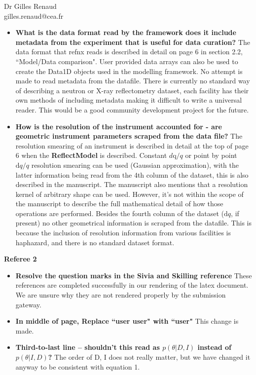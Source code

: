 \documentclass[fontsize=12pt, paper=a4]{scrlttr2}
\begin{document}
\begin{letter}{Dr Gilles Renaud \\ gilles.renaud@cea.fr}
\begin{itemize}
\item \textbf{What is the data format read by the framework does it include metadata from the experiment that is useful for data curation?} The data format that refnx reads is described in detail on page 6 in section 2.2, ``Model/Data comparison". User provided data arrays can also be used to create the Data1D objects used in the modelling framework. No attempt is made to read metadata from the datafile. There is currently no standard way of describing a neutron or X-ray reflectometry dataset, each facility has their own methods of including metadata making it difficult to write a universal reader. This would be a good community development project for the future.
\item \textbf{How is the resolution of the instrument accounted for - are geometric instrument parameters scraped from the data file?} The resolution smearing of an instrument is described in detail at the top of page 6 when the \textbf{ReflectModel} is described. Constant $d\mathrm{q}/q$ or point by point $\mathrm{d}q/q$ resolution smearing can be used (Gaussian approximation), with the latter information being read from the 4th column of the dataset, this is also described in the manuscript. The manuscript also mentions that a resolution kernel of arbitrary shape can be used. However, it's not within the scope of the manuscript to describe the full mathematical detail of how those operations are performed. Besides the fourth column of the dataset ($\mathrm{d}q$, if present) no other geometrical information is scraped from the datafile. This is because the inclusion of resolution information from various facilities is haphazard, and there is no standard dataset format.

\end{itemize}


\vskip12pt
\noindent
\textbf{Referee 2}
\begin{itemize}
\item \textbf{Resolve the question marks in the Sivia and Skilling reference} These references are completed successfully in our rendering of the latex document. We are unsure why they are not rendered properly by the submission gateway.
\item \textbf{In middle of page, Replace ``user user" with ``user"} This change is made.
\item \textbf{Third-to-last line – shouldn't this read as $p(\theta|D,I)$ instead of $p(\theta|I,D)$?} The order of D, I does not really matter, but we have changed it anyway to be consistent with equation 1.
\end{itemize}



\end{letter}
\end{document}
